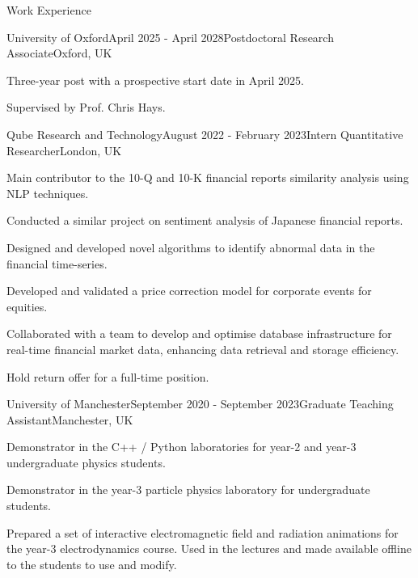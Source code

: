 \documentclass{resume} %
\begin{document}
    \begin{rSection}{Work Experience}
        \begin{rSubsection}{University of Oxford}{April 2025 - April 2028}{Postdoctoral Research Associate}{Oxford, UK}
            \item   Three-year post with a prospective start date in April 2025.
            \item   Supervised by Prof. Chris Hays. 
        \end{rSubsection}
        \begin{rSubsection}{Qube Research and Technology}{August 2022 - February 2023}{Intern Quantitative Researcher}{London, UK}
            \item Main contributor to the 10-Q and 10-K financial reports similarity analysis using NLP techniques.
            \item Conducted a similar project on sentiment analysis of Japanese financial reports.
            \item Designed and developed novel algorithms to identify abnormal data in the financial time-series.
            \item Developed and validated a price correction model for corporate events for equities.
            \item Collaborated with a team to develop and optimise database infrastructure for real-time financial market data, enhancing data retrieval and storage efficiency.
            \item Hold return offer for a full-time position.
        \end{rSubsection}
        \begin{rSubsection}{University of Manchester}{September 2020 - September 2023}{Graduate Teaching Assistant}{Manchester, UK}
            \item   Demonstrator in the C++ / Python laboratories for year-2 and year-3 undergraduate physics students.
            \item   Demonstrator in the year-3 particle physics laboratory for undergraduate students. 
            \item   Prepared a set of interactive electromagnetic field and radiation animations 
                for the year-3 electrodynamics course. Used in the lectures and made available 
                offline to the students to use and modify.
        \end{rSubsection}
    \end{rSection}
\end{document}
